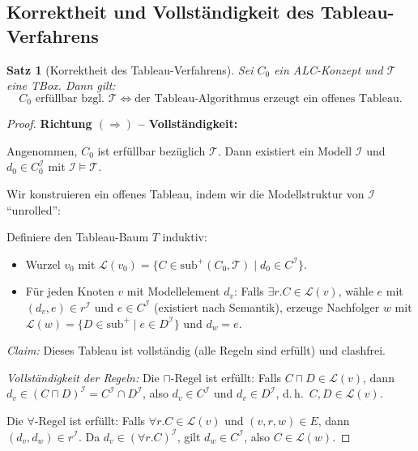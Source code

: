 ﻿\documentclass[a4paper,12pt]{article}
\theoremstyle{definition}
\theoremstyle{plain}
\newtheorem{satz}{Satz}[section]
\theoremstyle{remark}
\newcommand{\Tbox}{\ensuremath{\mathcal{T}}}
\newcommand{\interp}[1]{\ensuremath{\mathcal{#1}}}
\begin{document}
\subsection{Korrektheit und Vollst{\"{a}}ndigkeit des Tableau-Verfahrens}

\begin{satz}[Korrektheit des Tableau-Verfahrens]
\label{satz:tableau-korrektheit}
Sei $C_0$ ein \textsf{ALC}-Konzept und $\Tbox$ eine TBox.
Dann gilt:
\[
  C_0 \text{ erf{\"{u}}llbar bzgl. } \Tbox
  \iff \text{der Tableau-Algorithmus erzeugt ein offenes Tableau.}
\]
\end{satz}

\begin{proof}
\textbf{Richtung $(\Rightarrow)$ -- Vollst{\"{a}}ndigkeit:}

Angenommen, $C_0$ ist erf{\"{u}}llbar bez{\"{u}}glich $\Tbox$.
Dann existiert ein Modell $\interp{I}$ und $d_0 \in C_0^\interp{I}$
mit $\interp{I} \models \Tbox$.

Wir konstruieren ein offenes Tableau, indem wir die
Modellstruktur von $\interp{I}$ ``unrolled'':

Definiere den Tableau-Baum $T$ induktiv:
\begin{itemize}
  \item Wurzel $v_0$ mit $\mathcal{L}(v_0) = \{C \in \mathrm{sub}^+(C_0,\Tbox) \mid d_0 \in C^\interp{I}\}$.
  \item F{\"{u}}r jeden Knoten $v$ mit Modellelement $d_v$:
        Falls $\exists r.C \in \mathcal{L}(v)$,
        w{\"{a}}hle $e$ mit $(d_v, e) \in r^\interp{I}$ und $e \in C^\interp{I}$
        (existiert nach Semantik), erzeuge Nachfolger $w$ mit
        $\mathcal{L}(w) = \{D \in \mathrm{sub}^+\mid e \in D^\interp{I}\}$
        und $d_w = e$.
\end{itemize}

\textit{Claim:} Dieses Tableau ist vollst{\"{a}}ndig (alle Regeln sind
erf{\"{u}}llt) und clashfrei.

\textit{Vollst{\"{a}}ndigkeit der Regeln:}
Die $\sqcap$-Regel ist erf{\"{u}}llt: Falls $C \sqcap D \in \mathcal{L}(v)$,
dann $d_v \in (C \sqcap D)^\interp{I} = C^\interp{I} \cap D^\interp{I}$,
also $d_v \in C^\interp{I}$ und $d_v \in D^\interp{I}$, d.\,h.\
$C, D \in \mathcal{L}(v)$.

Die $\forall$-Regel ist erf{\"{u}}llt: Falls $\forall r.C \in \mathcal{L}(v)$
und $(v,r,w) \in E$, dann $(d_v, d_w) \in r^\interp{I}$.
Da $d_v \in (\forall r.C)^\interp{I}$, gilt $d_w \in C^\interp{I}$,
also $C \in \mathcal{L}(w)$.


\end{proof}
\end{document}
